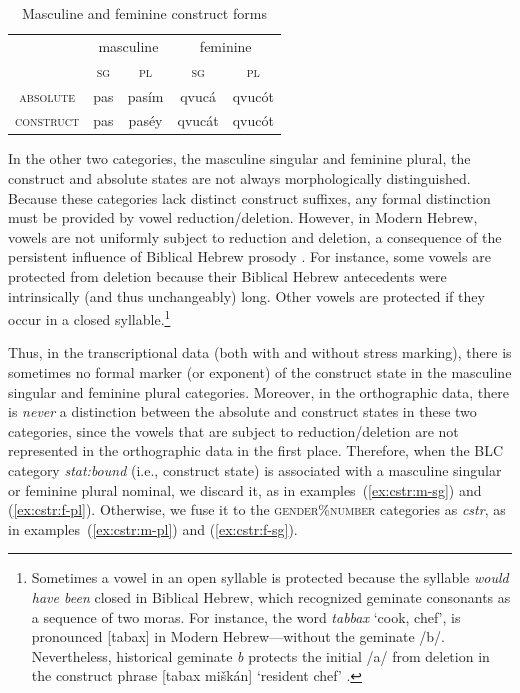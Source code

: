 {\begin{description}
   \begin{table}[t]
      \centering
      \setlength{\extrarowheight}{8pt}
         \small
      \begin{tabular}{ccccc} 
 \toprule
 &  \multicolumn{2}{c}{masculine} & \multicolumn{2}{c}{feminine} \\
 &  \textsc{sg} & \textsc{pl} & \textsc{sg} & \textsc{pl} \\
 \cmidrule{2-3} \cmidrule{4-5}
   \textsc{absolute} & pas & pas\'{i}m  & qvuc\'{a}	& qvuc\'{o}t \\
     \textsc{construct} & pas & pas\'{e}y & qvuc\'{a}t	& qvuc\'{o}t\\
    \bottomrule
    \end{tabular}
     \caption{Masculine and feminine construct forms}
             \label{tab:cstr-endings}
    \end{table}
    
In the other two categories, the masculine singular and feminine plural, 
the construct and absolute states are not always morphologically distinguished. 
Because these categories lack distinct construct suffixes, any formal distinction must 
be provided by vowel reduction/deletion. However, in Modern Hebrew, vowels are 
not uniformly subject to reduction and deletion, a consequence of the 
persistent influence of Biblical Hebrew prosody \citep{morag:1959, bolozky:1997, ravid-and-shlesinger:2001}. 
For instance, some vowels are protected from deletion because their 
Biblical Hebrew antecedents were intrinsically (and thus unchangeably) long. 
Other vowels are protected if they occur in a closed syllable.\footnote{Sometimes 
a vowel in an open syllable is protected because the syllable \emph{would have been} 
closed in Biblical Hebrew, which recognized geminate consonants as a sequence of two 
moras. For instance, the word \textit{tabbax} `cook, chef', is pronounced [tabax] in Modern Hebrew---without the geminate /b/. Nevertheless, historical geminate \textit{b} protects the initial /a/ from deletion in the construct phrase [tabax  mi\v{s}k\'an] `resident chef' \citep[see][p. 43]{bolozky-and-schwarzwald:1990}.}

Thus, in the transcriptional data (both with and without stress marking), there 
is sometimes no formal marker (or exponent) of the construct state in the masculine singular 
and feminine plural categories. 
Moreover, in the orthographic data, there is \emph{never} a distinction between 
the absolute and construct states in these 
two categories, since the vowels that are subject to reduction/deletion are not represented in the 
orthographic data in the first place.
Therefore, when the BLC category \textit{stat:bound} (i.e., construct state) is associated with a masculine singular or feminine plural nominal, we discard it, as in examples~(\ref{ex:cstr:m-sg}) and (\ref{ex:cstr:f-pl}). Otherwise, we fuse it to the \textsc{gender}\%\textsc{number} categories as \textit{cstr}, as in examples~(\ref{ex:cstr:m-pl}) and 
(\ref{ex:cstr:f-sg}).


\end{description}}
